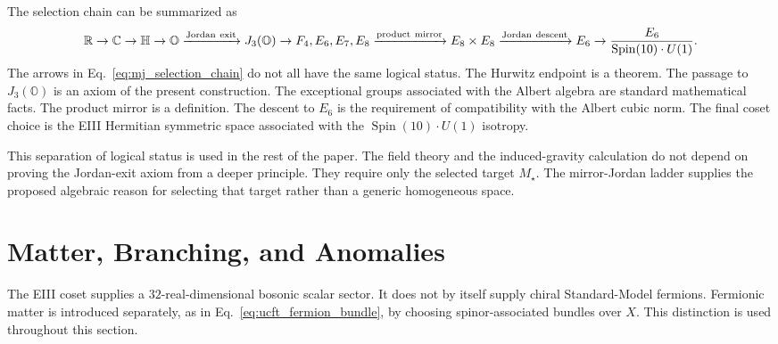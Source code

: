 \documentclass[aps,prd,preprint,longbibliography,nofootinbib,superscriptaddress,floatfix]{revtex4-2}
\newcommand{\Spin}{\operatorname{Spin}}
\begin{document}
The selection chain can be summarized as
\begin{equation}
    \mathbb R
    \to
    \mathbb C
    \to
    \mathbb H
    \to
    \mathbb O
    \xrightarrow{\rm Jordan\ exit}
    J_3(\mathbb O)
    \to
    F_4,E_6,E_7,E_8
    \xrightarrow{\rm product\ mirror}
    E_8\times E_8
    \xrightarrow{\rm Jordan\ descent}
    E_6
    \to
    \frac{E_6}{\Spin(10)\cdot U(1)} .
    \label{eq:mj_selection_chain}
\end{equation}
The arrows in Eq.~\eqref{eq:mj_selection_chain} do not all have the same
logical status. The Hurwitz endpoint is a theorem. The passage to
\(J_3(\mathbb O)\) is an axiom of the present construction. The exceptional
groups associated with the Albert algebra are standard mathematical facts. The
product mirror is a definition. The descent to \(E_6\) is the requirement of
compatibility with the Albert cubic norm. The final coset choice is the EIII
Hermitian symmetric space associated with the \(\Spin(10)\cdot U(1)\) isotropy.

This separation of logical status is used in the rest of the paper. The field
theory and the induced-gravity calculation do not depend on proving the
Jordan-exit axiom from a deeper principle. They require only the selected
target \(M_\star\). The mirror-Jordan ladder supplies the proposed algebraic
reason for selecting that target rather than a generic homogeneous space.


\section{Matter, Branching, and Anomalies}
\label{sec:matter_anomalies}

The EIII coset supplies a \(32\)-real-dimensional bosonic scalar sector. It
does not by itself supply chiral Standard-Model fermions. Fermionic matter is
introduced separately, as in Eq.~\eqref{eq:ucft_fermion_bundle}, by choosing
spinor-associated bundles over \(X\). This distinction is used throughout this
section.
\end{document}
